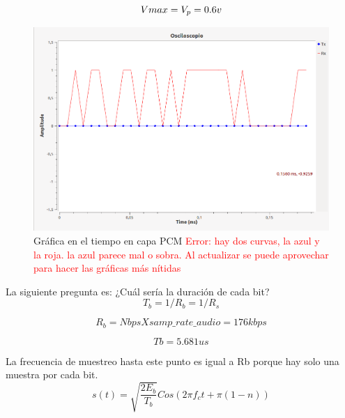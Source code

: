 \begin{itemize}
\begin{equation} \label{capcuatro_cincuentaynueve}
Vmax = V_{p}=0.6 v\\
\end{equation}

\vspace{200px}
\begin{figure}[h!]
    \captionsetup{justification = raggedright, singlelinecheck = false}
    \caption{Gráfica en el tiempo en capa PCM
    \label{fig:ej1_pcm_t}
    \textcolor{red}{Error: hay dos curvas, la azul y la roja. la azul parece mal o sobra. Al actualizar se puede aprovechar para hacer las gráficas más nítidas}}
    \includegraphics[width=0.7\linewidth]{Imagenes/tiempocapa6.png}
    \centering
\end{figure}

La siguiente pregunta es: ¿Cuál sería la duración de cada bit?\\

\begin{equation} \label{capcuatro_sesenta}
T_{b}=1/R_{b} = 1/R_{s}
\end{equation}

\begin{equation} \label{capcuatro_sesentayuno}
R_{b}= Nbps X samp\_rate\_audio =176kbps
\end{equation}

\begin{equation} \label{capcuatro_sesentaydos}
T{b}= 5.681us
\end{equation}


La frecuencia de muestreo hasta este punto es igual a Rb porque hay solo una muestra por cada bit.\\

\begin{equation} \label{capcuatro_sesentaytres}
s(t) = \sqrt{\dfrac{2E_{b}}{T_{b}}} Cos(2\pi f_{c}t+ \pi (1-n)) 
\end{equation}


\end{itemize}

